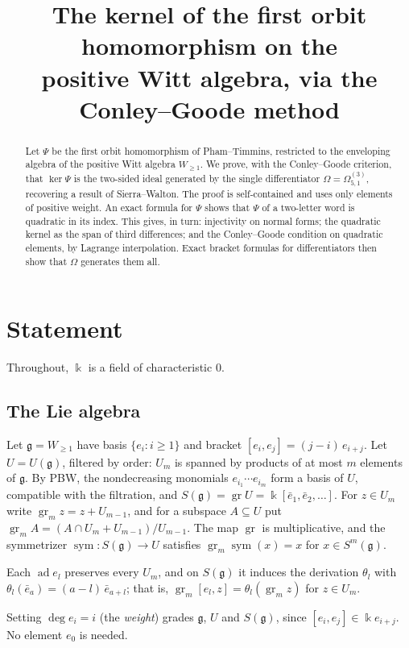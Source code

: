 \documentclass[11pt]{amsart}
\title[The kernel of $\Psi_1$ on $U(W_{\geq 1})$]{The kernel of the first orbit homomorphism on the\\ positive Witt algebra, via the Conley--Goode method}
\date{}
\theoremstyle{definition}
\theoremstyle{remark}
\newcommand{\Wp}{W_{\geq 1}}
\newcommand{\g}{\mathfrak{g}}
\newcommand{\U}{U}
\newcommand{\gr}{\operatorname{gr}}
\newcommand{\sym}{\operatorname{sym}}
\newcommand{\ad}{\operatorname{ad}}
\newcommand{\kk}{\Bbbk}
\newcommand{\eb}{\bar e}
\begin{document}
\begin{abstract}
Let $\Psi$ be the first orbit homomorphism of Pham--Timmins, restricted to the enveloping algebra of the positive Witt algebra $\Wp$. We prove, with the Conley--Goode criterion, that $\ker\Psi$ is the two-sided ideal generated by the single differentiator $\Omega=\Omega^{(3)}_{5,1}$, recovering a result of Sierra--Walton. The proof is self-contained and uses only elements of positive weight. An exact formula for $\Psi$ shows that $\Psi$ of a two-letter word is quadratic in its index. This gives, in turn: injectivity on normal forms; the quadratic kernel as the span of third differences; and the Conley--Goode condition on quadratic elements, by Lagrange interpolation. Exact bracket formulas for differentiators then show that $\Omega$ generates them all.
\end{abstract}
\maketitle

\section{Statement}

Throughout, $\kk$ is a field of characteristic $0$.

\subsection*{The Lie algebra}
Let $\g=\Wp$ have basis $\{e_i : i\ge1\}$ and bracket $[e_i,e_j]=(j-i)\,e_{i+j}$. Let $\U=\U(\g)$, filtered by order: $\U_m$ is spanned by products of at most $m$ elements of $\g$. By PBW, the nondecreasing monomials $e_{i_1}\cdots e_{i_m}$ form a basis of $\U$, compatible with the filtration, and $S(\g)=\gr\U=\kk[\eb_1,\eb_2,\dots]$. For $z\in\U_m$ write $\gr_mz=z+\U_{m-1}$, and for a subspace $A\subseteq\U$ put $\gr_mA=(A\cap\U_m+\U_{m-1})/\U_{m-1}$. The map $\gr$ is multiplicative, and the symmetrizer $\sym:S(\g)\to\U$ satisfies $\gr_m\sym(x)=x$ for $x\in S^m(\g)$.

Each $\ad e_l$ preserves every $\U_m$, and on $S(\g)$ it induces the derivation $\theta_l$ with $\theta_l(\eb_a)=(a-l)\,\eb_{a+l}$; that is, $\gr_m[e_l,z]=\theta_l(\gr_mz)$ for $z\in\U_m$.

Setting $\deg e_i=i$ (the \emph{weight}) grades $\g$, $\U$ and $S(\g)$, since $[e_i,e_j]\in\kk e_{i+j}$. No element $e_0$ is needed.
\end{document}

